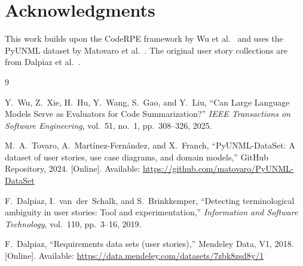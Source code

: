 \documentclass[lettersize,journal]{IEEEtran}
\begin{document}
\section*{Acknowledgments}

This work builds upon the CodeRPE framework by Wu et al.~\cite{wu2025coderpe} and uses the PyUNML dataset by Matovaro et al.~\cite{pyunml}. The original user story collections are from Dalpiaz et al.~\cite{dalpiaz2018,dalpiaz2020}.

\begin{thebibliography}{9}

Y.~Wu, Z.~Xie, H.~Hu, Y.~Wang, S.~Gao, and Y.~Liu,
``Can Large Language Models Serve as Evaluators for Code Summarization?''
\textit{IEEE Transactions on Software Engineering}, vol.~51, no.~1, pp.~308--326, 2025.

M.~A.~Tovaro, A.~Mart\'{i}nez-Fern\'{a}ndez, and X.~Franch,
``PyUNML-DataSet: A dataset of user stories, use case diagrams, and domain models,''
GitHub Repository, 2024.
[Online]. Available: \url{https://github.com/matovaro/PyUNML-DataSet}

F.~Dalpiaz, I.~van~der~Schalk, and S.~Brinkkemper,
``Detecting terminological ambiguity in user stories: Tool and experimentation,''
\textit{Information and Software Technology}, vol.~110, pp.~3--16, 2019.

F.~Dalpiaz,
``Requirements data sets (user stories),''
Mendeley Data, V1, 2018.
[Online]. Available: \url{https://data.mendeley.com/datasets/7zbk8zsd8y/1}

\end{thebibliography}
\end{document}
